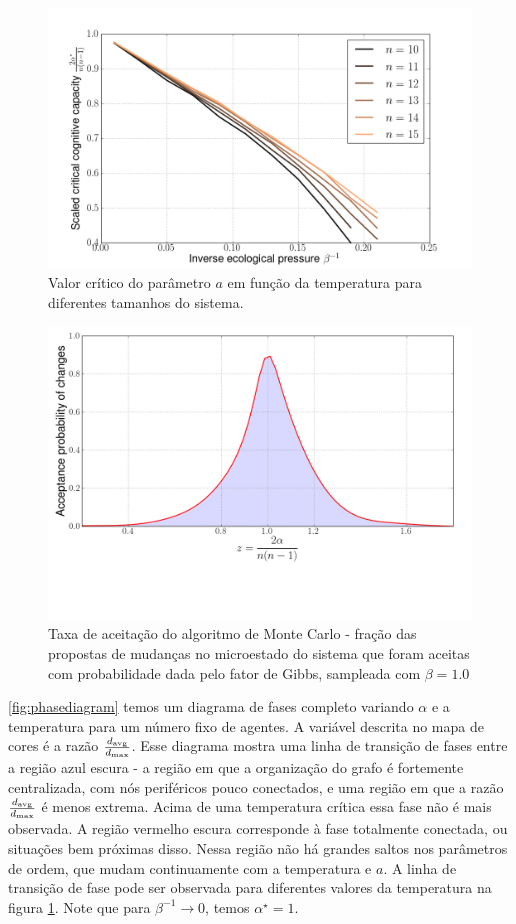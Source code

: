 \begin{figure}
  \includegraphics[width = \textwidth]{figuras/critical.png}
  \caption{Valor crítico do parâmetro $a$ em função da temperatura para diferentes tamanhos do sistema.}
  \label{fig:critical}
\end{figure}
\begin{figure}
  \includegraphics[width = \textwidth]{figuras/acceptrate.png}
  \caption{Taxa de aceitação do algoritmo de Monte Carlo - fração das propostas de mudanças no microestado do sistema que foram aceitas com probabilidade dada pelo fator de Gibbs, sampleada com $\beta = 1.0$}
  \label{fig:acceptrate}
\end{figure}

\ref{fig:phasediagram} temos um diagrama de fases completo variando $\alpha$ e a temperatura para um número fixo de agentes. A variável descrita no mapa de cores é a razão $\frac{d_{\text{avg}}}{d_{\text{max}}}$. Esse diagrama mostra uma linha de transição de fases entre a região azul escura - a região em que a organização do grafo é fortemente centralizada, com nós periféricos pouco conectados, e uma região em que a razão $\frac{d_{\text{avg}}}{d_{\text{max}}}$ é menos extrema. Acima de uma temperatura crítica essa fase não é mais observada. A região vermelho escura corresponde à fase totalmente conectada, ou situações bem próximas disso. Nessa região não há grandes saltos nos parâmetros de ordem, que mudam continuamente com a temperatura e $a$. A linha de transição de fase pode ser observada para diferentes valores da temperatura na figura \ref{fig:critical}. Note que para $\beta^{-1} \to 0$, temos $\alpha^{\star} = 1$.



